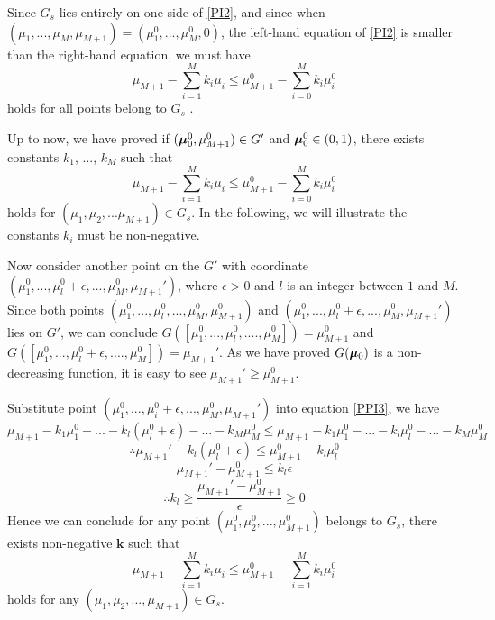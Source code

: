 Since $G_s$ lies entirely on one side of \eqref{PI2}, and since when $(\mu_1, ... ,\mu_M, \mu_{M+1})=(\mu_1^0, ..., \mu_M^0, 0)$, the left-hand equation of \eqref{PI2} is smaller than the right-hand equation, we must have 
\begin{equation}
\mu_{M+1} - \sum_{i=1}^{M}k_i\mu_i \leq \mu_{M+1}^0 - \sum_{i=0}^{M}k_i\mu_i^0
\label{PI3}
\end{equation}
holds for all points belong to $G_s$ \cite{dantzig1951fundamental}. 

Up to now, we have proved if  $(\boldsymbol{\mu}_0^0, \mu_{M+1}^0) \in G'$ and $\boldsymbol{\mu}_0^0 \in (0, 1)$, there exists constants $k_1$, ..., $k_M$ such that
\begin{equation}
\mu_{M+1} - \sum_{i=1}^{M}k_i\mu_i \leq \mu_{M+1}^0 - \sum_{i=0}^{M}k_i\mu_i^0
\label{PPI3}
\end{equation}
holds for  $(\mu_1, \mu_2, ...\mu_{M+1}) \in G_s$. In the following, we will illustrate the constants $k_i$ must be non-negative.   

Now consider another point on the $G'$ with coordinate $(\mu_1^0, ..., \mu_l^0+\epsilon, ..., \mu_M^0, \mu_{M+1}')$, where $\epsilon > 0$ and $l$ is an integer between $1$ and $M$.  Since both points $(\mu_1^0, ..., \mu_l^0, ..., \mu_M^0, \mu_{M+1}^0)$ and $(\mu_1^0, ..., \mu_l^0+\epsilon, ..., \mu_M^0, \mu_{M+1}')$ lies on $G'$, we can conclude $G([\mu_1^0, ..., \mu_l^0, ...., \mu_M^0]) = \mu_{M+1}^0$ and $G([\mu_1^0, ..., \mu_l^0 + \epsilon, ...., \mu_M^0]) = \mu_{M+1}'$. As we have proved $G(\boldsymbol{\mu}_0)$ is a non-decreasing function, it is easy to see $\mu_{M+1}' \geq \mu_{M+1}^0$.

Substitute point $(\mu_1^0, ..., \mu_i^0+\epsilon, ..., \mu_M^0, \mu_{M+1}')$  into equation \eqref{PPI3}, we have
\begin{equation}
\mu_{M+1} - k_1\mu_1^0 - ... - k_l(\mu_l^0+\epsilon)- ... - k_M\mu_M^0 \leq \mu_{M+1} - k_1\mu_1^0 - ... - k_l\mu_l^0- ... - k_M\mu_M^0
\end{equation}
\begin{equation}
\therefore \mu_{M+1}' - k_l(\mu_l^0+\epsilon)\leq \mu_{M+1}^0 - k_l\mu_l^0
\end{equation}
\begin{equation}
\mu_{M+1}' - \mu_{M+1}^0 \leq k_l\epsilon
\end{equation}
\[
\therefore k_l \geq \frac{\mu_{M+1}' - \mu_{M+1}^0}{\epsilon} \geq 0
\]
Hence we can conclude for any point $(\mu_1^0, \mu_2^0, ..., \mu_{M+1}^0)$ belongs to $G_s$, there exists non-negative $\mathbf{k}$ such that 
\begin{equation}
\mu_{M+1} - \sum_{i=1}^{M}k_i\mu_i \leq \mu_{M+1}^0 - \sum_{i=1}^{M}k_i\mu_i^0
\end{equation}
holds for any $(\mu_1, \mu_2, ..., \mu_{M+1}) \in G_s$.

